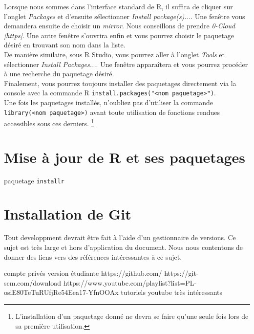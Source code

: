 Lorsque nous sommes dans l'interface standard de R, il suffira de cliquer sur l'onglet \emph{Packages} et d'ensuite sélectionner \emph{Install package(s)...}. Une fenêtre vous demandera ensuite de choisir un \emph{mirror}. Nous conseillons de prendre \emph{0-Cloud [https]}. Une autre fenêtre s'ouvrira enfin et vous pourrez choisir le paquetage désiré en trouvant son nom dans la liste. \\

De manière similaire, sous R Studio, vous pourrez aller à l'onglet \emph{Tools} et sélectionner \emph{Install Packages...}. Une fenêtre apparaîtera et vous pourrez procéder à une recherche du paquetage désiré. \\

Finalement, vous pourrez toujours installer des paquetages directement via la console avec la commande R \texttt{install.packages("<nom paquetage>")}. \\

Une fois les paquetages installés, n'oubliez pas d'utiliser la commande \texttt{library(<nom paquetage>)} avant toute utilisation de fonctions rendues accessibles sous ces derniers. \footnote{L'installation d'un paquetage donné ne devra se faire qu'une seule fois lors de sa première utilisation.}

\section{Mise à jour de R et ses paquetages}
paquetage \texttt{installr}
% 
%
% 
%

\section{Installation de Git}
Tout developpment devrait être fait à l'aide d'un gestionnaire de versions. Ce sujet est très large et hors d'application du document. Nous nous contentons de donner des liens vers des références intéressantes à ce sujet.

compte privés
version étudiante
https://github.com/
https://git-scm.com/download
https://www.youtube.com/playlist?list=PL-osiE80TeTuRUfjRe54Eea17-YfnOOAx
tutoriels youtube très intéressants